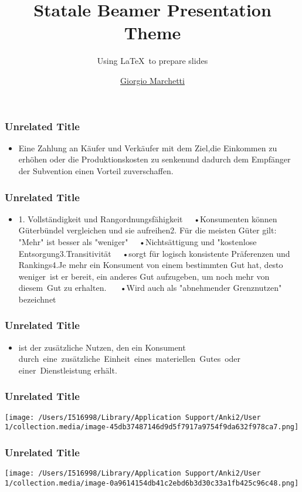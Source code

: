 \documentclass{beamer}
\title{Statale Beamer Presentation Theme}
\subtitle{Using \LaTeX\ to prepare slides}
\author{\href{mailto:ciao@gio.im}{Giorgio Marchetti}}
\begin{document}
\begin{frame}
\frametitle{Unrelated Title}


\begin{itemize}
\item Eine Zahlung an Käufer und Verkäufer mit dem Ziel,die Einkommen zu erhöhen oder die Produktionskosten zu senkenund dadurch dem Empfänger der Subvention einen Vorteil zuverschaffen.
\end{itemize}

\note[item]{}
\end{frame}
\begin{frame}
\frametitle{Unrelated Title}


\begin{itemize}
\item 1. Vollständigkeit und Rangordnungsfähigkeit   •Konsumenten können Güterbündel vergleichen und sie aufreihen2. Für die meisten Güter gilt: "Mehr" ist besser als "weniger"   •Nichtsättigung und "kostenlose Entsorgung3.Transitivität   •sorgt für logisch konsistente Präferenzen und Rankings4.Je mehr ein Konsument von einem bestimmten Gut hat, desto weniger ist er bereit, ein anderes Gut aufzugeben, um noch mehr von diesem Gut zu erhalten.    •Wird auch als "abnehmender Grenznutzen" bezeichnet
\end{itemize}

\note[item]{}
\end{frame}
\begin{frame}
\frametitle{Unrelated Title}


\begin{itemize}
\item ist der zusätzliche Nutzen, den ein Konsument durch eine zusätzliche Einheit eines materiellen Gutes oder einer Dienstleistung erhält.
\end{itemize}

\note[item]{}
\end{frame}
\begin{frame}
\frametitle{Unrelated Title}

\begin{center}
\texttt{[image: /Users/I516998/Library/Application Support/Anki2/User 1/collection.media/image-45db37487146d9d5f7917a9754f9da632f978ca7.png]}
\end{center}


\note[item]{}
\end{frame}
\begin{frame}
\frametitle{Unrelated Title}

\begin{center}
\texttt{[image: /Users/I516998/Library/Application Support/Anki2/User 1/collection.media/image-0a9614154db41c2ebd6b3d30c33a1fb425c96c48.png]}
\end{center}


\note[item]{}
\end{frame}
\end{document}
